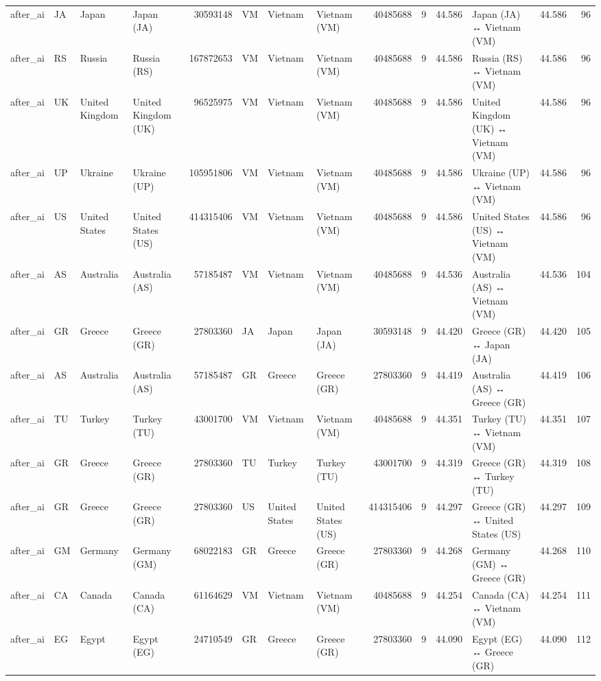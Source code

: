 \begin{tabular}{llllrlllrrrlrr}
after\_ai & JA & Japan & Japan (JA) & 30593148 & VM & Vietnam & Vietnam (VM) & 40485688 & 9 & 44.586 & Japan (JA) ↔ Vietnam (VM) & 44.586 & 96 \\
after\_ai & RS & Russia & Russia (RS) & 167872653 & VM & Vietnam & Vietnam (VM) & 40485688 & 9 & 44.586 & Russia (RS) ↔ Vietnam (VM) & 44.586 & 96 \\
after\_ai & UK & United Kingdom & United Kingdom (UK) & 96525975 & VM & Vietnam & Vietnam (VM) & 40485688 & 9 & 44.586 & United Kingdom (UK) ↔ Vietnam (VM) & 44.586 & 96 \\
after\_ai & UP & Ukraine & Ukraine (UP) & 105951806 & VM & Vietnam & Vietnam (VM) & 40485688 & 9 & 44.586 & Ukraine (UP) ↔ Vietnam (VM) & 44.586 & 96 \\
after\_ai & US & United States & United States (US) & 414315406 & VM & Vietnam & Vietnam (VM) & 40485688 & 9 & 44.586 & United States (US) ↔ Vietnam (VM) & 44.586 & 96 \\
after\_ai & AS & Australia & Australia (AS) & 57185487 & VM & Vietnam & Vietnam (VM) & 40485688 & 9 & 44.536 & Australia (AS) ↔ Vietnam (VM) & 44.536 & 104 \\
after\_ai & GR & Greece & Greece (GR) & 27803360 & JA & Japan & Japan (JA) & 30593148 & 9 & 44.420 & Greece (GR) ↔ Japan (JA) & 44.420 & 105 \\
after\_ai & AS & Australia & Australia (AS) & 57185487 & GR & Greece & Greece (GR) & 27803360 & 9 & 44.419 & Australia (AS) ↔ Greece (GR) & 44.419 & 106 \\
after\_ai & TU & Turkey & Turkey (TU) & 43001700 & VM & Vietnam & Vietnam (VM) & 40485688 & 9 & 44.351 & Turkey (TU) ↔ Vietnam (VM) & 44.351 & 107 \\
after\_ai & GR & Greece & Greece (GR) & 27803360 & TU & Turkey & Turkey (TU) & 43001700 & 9 & 44.319 & Greece (GR) ↔ Turkey (TU) & 44.319 & 108 \\
after\_ai & GR & Greece & Greece (GR) & 27803360 & US & United States & United States (US) & 414315406 & 9 & 44.297 & Greece (GR) ↔ United States (US) & 44.297 & 109 \\
after\_ai & GM & Germany & Germany (GM) & 68022183 & GR & Greece & Greece (GR) & 27803360 & 9 & 44.268 & Germany (GM) ↔ Greece (GR) & 44.268 & 110 \\
after\_ai & CA & Canada & Canada (CA) & 61164629 & VM & Vietnam & Vietnam (VM) & 40485688 & 9 & 44.254 & Canada (CA) ↔ Vietnam (VM) & 44.254 & 111 \\
after\_ai & EG & Egypt & Egypt (EG) & 24710549 & GR & Greece & Greece (GR) & 27803360 & 9 & 44.090 & Egypt (EG) ↔ Greece (GR) & 44.090 & 112 \\

\end{tabular}

